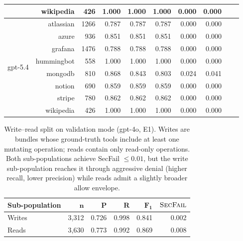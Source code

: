 \documentclass[10pt,a4paper,twocolumn]{article}
\begin{document}
\begin{table}[H]
\begin{tabular}{@{}lrrrrrrrrr@{}}
 & wikipedia      &  426 & 1.000 & 1.000 & 1.000 & 0.000 & 0.000 \\
\midrule
\multirow{8}{*}{gpt-5.4}
 & atlassian      & 1266 & 0.787 & 0.787 & 0.787 & 0.000 & 0.000 \\
 & azure          &  936 & 0.851 & 0.851 & 0.851 & 0.000 & 0.000 \\
 & grafana        & 1476 & 0.788 & 0.788 & 0.788 & 0.000 & 0.000 \\
 & hummingbot     &  558 & 1.000 & 1.000 & 1.000 & 0.000 & 0.000 \\
 & mongodb        &  810 & 0.868 & 0.843 & 0.803 & 0.024 & 0.041 \\
 & notion         &  690 & 0.859 & 0.859 & 0.859 & 0.000 & 0.000 \\
 & stripe         &  780 & 0.862 & 0.862 & 0.862 & 0.000 & 0.000 \\
 & wikipedia      &  426 & 1.000 & 1.000 & 1.000 & 0.000 & 0.000 \\
\bottomrule
\end{tabular}
\end{table}

\begin{table}[H]
\centering
\caption{Write--read split on validation mode (gpt-4o, E1). Writes are bundles whose ground-truth tools include at least one mutating operation; reads contain only read-only operations. Both sub-populations achieve SecFail $\leq 0.01$, but the write sub-population reaches it through aggressive denial (higher recall, lower precision) while reads admit a slightly broader allow envelope.}
\label{tab:write_read}
\small
\setlength{\tabcolsep}{4pt}
\begin{tabular}{@{}lrrrrr@{}}
\toprule
\textbf{Sub-population} & $\mathbf{n}$ & $\mathbf{P}$ & $\mathbf{R}$ & $\mathbf{F_1}$ & $\textsc{SecFail}$ \\
\midrule
Writes & 3{,}312 & 0.726 & 0.998 & 0.841 & 0.002 \\
Reads  & 3{,}630 & 0.773 & 0.992 & 0.869 & 0.008 \\
\bottomrule
\end{tabular}
\end{table}
\end{document}
